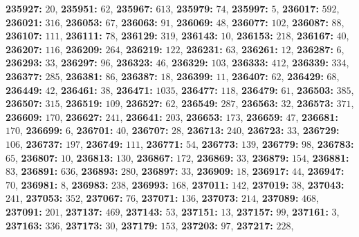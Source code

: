 \textsf{\bfseries 235927:} $20$, \textsf{\bfseries 235951:} $62$, \textsf{\bfseries 235967:} $613$, \textsf{\bfseries 235979:} $74$, \textsf{\bfseries 235997:} $5$, \textsf{\bfseries 236017:} $592$, \textsf{\bfseries 236021:} $316$, \textsf{\bfseries 236053:} $67$, \textsf{\bfseries 236063:} $91$, \textsf{\bfseries 236069:} $48$, \textsf{\bfseries 236077:} $102$, \textsf{\bfseries 236087:} $88$, \textsf{\bfseries 236107:} $111$, \textsf{\bfseries 236111:} $78$, \textsf{\bfseries 236129:} $319$, \textsf{\bfseries 236143:} $10$, \textsf{\bfseries 236153:} $218$, \textsf{\bfseries 236167:} $40$, \textsf{\bfseries 236207:} $116$, \textsf{\bfseries 236209:} $264$, \textsf{\bfseries 236219:} $122$, \textsf{\bfseries 236231:} $63$, \textsf{\bfseries 236261:} $12$, \textsf{\bfseries 236287:} $6$, \textsf{\bfseries 236293:} $33$, \textsf{\bfseries 236297:} $96$, \textsf{\bfseries 236323:} $46$, \textsf{\bfseries 236329:} $103$, \textsf{\bfseries 236333:} $412$, \textsf{\bfseries 236339:} $334$, \textsf{\bfseries 236377:} $285$, \textsf{\bfseries 236381:} $86$, \textsf{\bfseries 236387:} $18$, \textsf{\bfseries 236399:} $11$, \textsf{\bfseries 236407:} $62$, \textsf{\bfseries 236429:} $68$, \textsf{\bfseries 236449:} $42$, \textsf{\bfseries 236461:} $38$, \textsf{\bfseries 236471:} $1035$, \textsf{\bfseries 236477:} $118$, \textsf{\bfseries 236479:} $61$, \textsf{\bfseries 236503:} $385$, \textsf{\bfseries 236507:} $315$, \textsf{\bfseries 236519:} $109$, \textsf{\bfseries 236527:} $62$, \textsf{\bfseries 236549:} $287$, \textsf{\bfseries 236563:} $32$, \textsf{\bfseries 236573:} $371$, \textsf{\bfseries 236609:} $170$, \textsf{\bfseries 236627:} $241$, \textsf{\bfseries 236641:} $203$, \textsf{\bfseries 236653:} $173$, \textsf{\bfseries 236659:} $47$, \textsf{\bfseries 236681:} $170$, \textsf{\bfseries 236699:} $6$, \textsf{\bfseries 236701:} $40$, \textsf{\bfseries 236707:} $28$, \textsf{\bfseries 236713:} $240$, \textsf{\bfseries 236723:} $33$, \textsf{\bfseries 236729:} $106$, \textsf{\bfseries 236737:} $197$, \textsf{\bfseries 236749:} $111$, \textsf{\bfseries 236771:} $54$, \textsf{\bfseries 236773:} $139$, \textsf{\bfseries 236779:} $98$, \textsf{\bfseries 236783:} $65$, \textsf{\bfseries 236807:} $10$, \textsf{\bfseries 236813:} $130$, \textsf{\bfseries 236867:} $172$, \textsf{\bfseries 236869:} $33$, \textsf{\bfseries 236879:} $154$, \textsf{\bfseries 236881:} $83$, \textsf{\bfseries 236891:} $636$, \textsf{\bfseries 236893:} $280$, \textsf{\bfseries 236897:} $33$, \textsf{\bfseries 236909:} $18$, \textsf{\bfseries 236917:} $44$, \textsf{\bfseries 236947:} $70$, \textsf{\bfseries 236981:} $8$, \textsf{\bfseries 236983:} $238$, \textsf{\bfseries 236993:} $168$, \textsf{\bfseries 237011:} $142$, \textsf{\bfseries 237019:} $38$, \textsf{\bfseries 237043:} $241$, \textsf{\bfseries 237053:} $352$, \textsf{\bfseries 237067:} $76$, \textsf{\bfseries 237071:} $136$, \textsf{\bfseries 237073:} $214$, \textsf{\bfseries 237089:} $468$, \textsf{\bfseries 237091:} $201$, \textsf{\bfseries 237137:} $469$, \textsf{\bfseries 237143:} $53$, \textsf{\bfseries 237151:} $13$, \textsf{\bfseries 237157:} $99$, \textsf{\bfseries 237161:} $3$, \textsf{\bfseries 237163:} $336$, \textsf{\bfseries 237173:} $30$, \textsf{\bfseries 237179:} $153$, \textsf{\bfseries 237203:} $97$, \textsf{\bfseries 237217:} $228$, 

